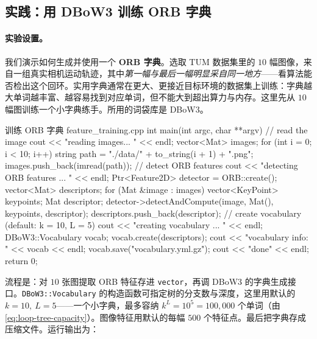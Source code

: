 \subsection{实践：用 DBoW3 训练 ORB 字典}
\label{sec:loop-dict-practice}

\paragraph{实验设置。}
我们演示如何生成并使用一个 \textbf{ORB 字典}\cite{gaoxiang2019slam14}。选取 TUM 数据集里的 $10$ 幅图像，来自一组真实相机运动轨迹，其中\emph{第一幅与最后一幅明显采自同一地方}——看算法能否检出这个回环。实用字典通常在更大、更接近目标环境的数据集上训练：字典越大单词越丰富、越容易找到对应单词，但不能大到超出算力与内存。这里先从 $10$ 幅图训练一个小字典练手。所用的词袋库是 DBoW3。

\begin{codebox}[C++]{训练 ORB 字典 feature\_training.cpp}
int main(int argc, char **argv) {
    // read the image
    cout << "reading images... " << endl;
    vector<Mat> images;
    for (int i = 0; i < 10; i++) {
        string path = "./data/" + to_string(i + 1) + ".png";
        images.push_back(imread(path));
    }
    // detect ORB features
    cout << "detecting ORB features ... " << endl;
    Ptr<Feature2D> detector = ORB::create();
    vector<Mat> descriptors;
    for (Mat &image : images) {
        vector<KeyPoint> keypoints;
        Mat descriptor;
        detector->detectAndCompute(image, Mat(), keypoints, descriptor);
        descriptors.push_back(descriptor);
    }
    // create vocabulary (default: k = 10, L = 5)
    cout << "creating vocabulary ... " << endl;
    DBoW3::Vocabulary vocab;
    vocab.create(descriptors);
    cout << "vocabulary info: " << vocab << endl;
    vocab.save("vocabulary.yml.gz");
    cout << "done" << endl;
    return 0;
}
\end{codebox}

\noindent 流程是：对 $10$ 张图提取 ORB 特征存进 \verb|vector|，再调 DBoW3 的字典生成接口\cite{gaoxiang2019slam14}。\verb|DBoW3::Vocabulary| 的构造函数可指定树的分支数与深度，这里用默认的 \textbf{$k=10,\ L=5$}——一个小字典，最多容纳 $k^L=10^5=100{,}000$ 个单词（由 \cref{eq:loop-tree-capacity}）。图像特征用默认的每幅 $500$ 个特征点。最后把字典存成压缩文件。运行输出为：



